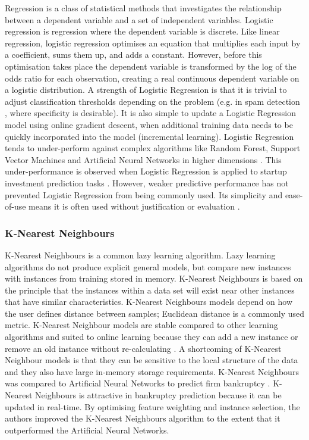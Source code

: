 \documentclass[../thesis/thesis.tex]{subfiles}
\begin{document}
Regression is a class of statistical methods that investigates the relationship between a dependent variable and a set of independent variables. Logistic regression is regression where the dependent variable is discrete. Like linear regression, logistic regression optimises an equation that multiplies each input by a coefficient, sums them up, and adds a constant. However, before this optimisation takes place the dependent variable is transformed by the log of the odds ratio for each observation, creating a real continuous dependent variable on a logistic distribution. A strength of Logistic Regression is that it is trivial to adjust classification thresholds depending on the problem (e.g. in spam detection \cite{friedman2001}, where specificity is desirable). It is also simple to update a Logistic Regression model using online gradient descent, when additional training data needs to be quickly incorporated into the model (incremental learning). Logistic Regression tends to under-perform against complex algorithms like Random Forest, Support Vector Machines and Artificial Neural Networks in higher dimensions \cite{caruana2008}. This under-performance is observed when Logistic Regression is applied to startup investment prediction tasks \cite{beckwith2016, bhat2011}. However, weaker predictive performance has not prevented Logistic Regression from being commonly used. Its simplicity and ease-of-use means it is often used without justification or evaluation \cite{gimmon2010}.

\subsubsection{K-Nearest Neighbours}

K-Nearest Neighbours is a common lazy learning algorithm. Lazy learning algorithms do not produce explicit general models, but compare new instances with instances from training stored in memory. K-Nearest Neighbours is based on the principle that the instances within a data set will exist near other instances that have similar characteristics. K-Nearest Neighbours models depend on how the user defines distance between samples; Euclidean distance is a commonly used metric. K-Nearest Neighbour models are stable compared to other learning algorithms and suited to online learning because they can add a new instance or remove an old instance without re-calculating \cite{kotsiantis2007}. A shortcoming of K-Nearest Neighbour models is that they can be sensitive to the local structure of the data and they also have large in-memory storage requirements. K-Nearest Neighbours was compared to Artificial Neural Networks to predict firm bankruptcy \cite{ahn2008}. K-Nearest Neighbours is attractive in bankruptcy prediction because it can be updated in real-time. By optimising feature weighting and instance selection, the authors improved the K-Nearest Neighbours algorithm to the extent that it outperformed the Artificial Neural Networks.
\end{document}
